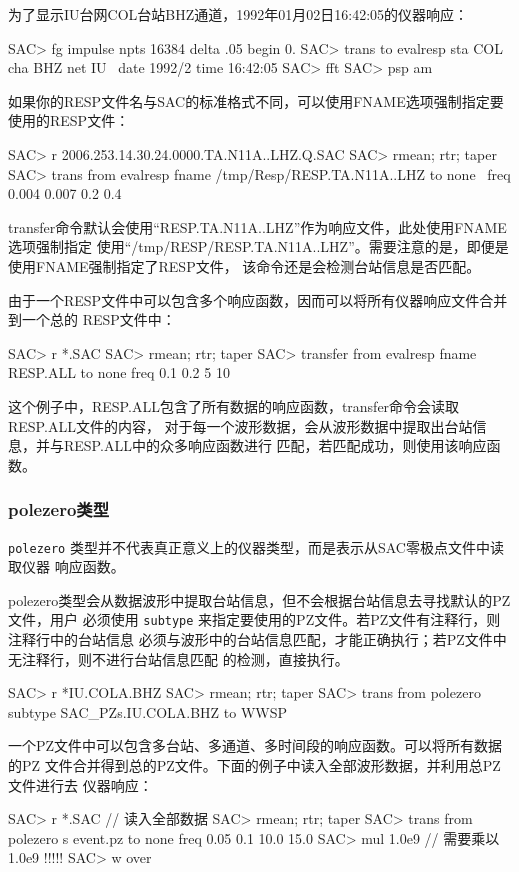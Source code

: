 为了显示IU台网COL台站BHZ通道，1992年01月02日16:42:05的仪器响应：
\begin{SACCode}
SAC> fg impulse npts 16384 delta .05 begin 0.
SAC> trans to evalresp sta COL cha BHZ net IU \
                    date 1992/2 time 16:42:05
SAC> fft
SAC> psp am
\end{SACCode}

如果你的RESP文件名与SAC的标准格式不同，可以使用FNAME选项强制指定要使用的RESP文件：
\begin{SACCode}
SAC> r 2006.253.14.30.24.0000.TA.N11A..LHZ.Q.SAC
SAC> rmean; rtr; taper
SAC> trans from evalresp fname /tmp/Resp/RESP.TA.N11A..LHZ to none \
                        freq 0.004 0.007 0.2 0.4
\end{SACCode}
transfer命令默认会使用``RESP.TA.N11A..LHZ''作为响应文件，此处使用FNAME选项强制指定
使用``/tmp/RESP/RESP.TA.N11A..LHZ''。需要注意的是，即便是使用FNAME强制指定了RESP文件，
该命令还是会检测台站信息是否匹配。

由于一个RESP文件中可以包含多个响应函数，因而可以将所有仪器响应文件合并到一个总的
RESP文件中：
\begin{SACCode}
SAC> r *.SAC
SAC> rmean; rtr; taper
SAC> transfer from evalresp fname RESP.ALL to none freq 0.1 0.2 5 10
\end{SACCode}
这个例子中，RESP.ALL包含了所有数据的响应函数，transfer命令会读取RESP.ALL文件的内容，
对于每一个波形数据，会从波形数据中提取出台站信息，并与RESP.ALL中的众多响应函数进行
匹配，若匹配成功，则使用该响应函数。

\subsubsection{polezero类型}
\texttt{polezero} 类型并不代表真正意义上的仪器类型，而是表示从SAC零极点文件中读取仪器
响应函数。

polezero类型会从数据波形中提取台站信息，但不会根据台站信息去寻找默认的PZ文件，用户
必须使用 \texttt{subtype} 来指定要使用的PZ文件。若PZ文件有注释行，则注释行中的台站信息
必须与波形中的台站信息匹配，才能正确执行；若PZ文件中无注释行，则不进行台站信息匹配
的检测，直接执行。
\begin{SACCode}
SAC> r *IU.COLA.BHZ
SAC> rmean; rtr; taper
SAC> trans from polezero subtype SAC_PZs.IU.COLA.BHZ to WWSP
\end{SACCode}

一个PZ文件中可以包含多台站、多通道、多时间段的响应函数。可以将所有数据的PZ
文件合并得到总的PZ文件。下面的例子中读入全部波形数据，并利用总PZ文件进行去
仪器响应：
\begin{SACCode}
SAC> r *.SAC          // 读入全部数据
SAC> rmean; rtr; taper
SAC> trans from polezero s event.pz to none freq 0.05 0.1 10.0 15.0
SAC> mul 1.0e9        // 需要乘以1.0e9 !!!!!
SAC> w over
\end{SACCode}

